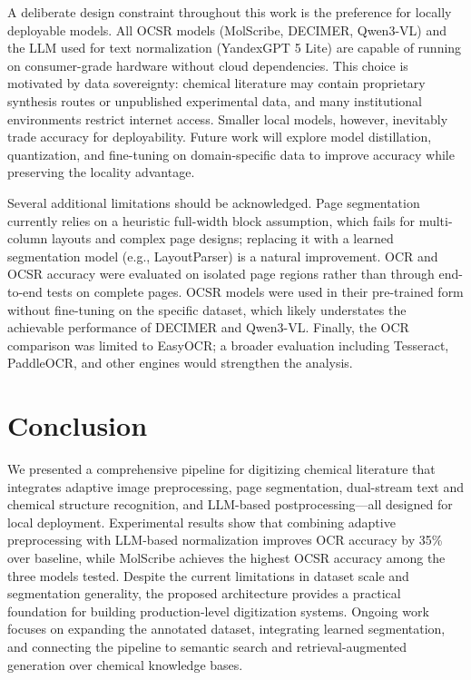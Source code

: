 \documentclass[conference]{IEEEtran}
\begin{document}
A deliberate design constraint throughout this work is the preference for locally deployable models. All OCSR models (MolScribe, DECIMER, Qwen3-VL) and the LLM used for text normalization (YandexGPT 5 Lite) are capable of running on consumer-grade hardware without cloud dependencies. This choice is motivated by data sovereignty: chemical literature may contain proprietary synthesis routes or unpublished experimental data, and many institutional environments restrict internet access. Smaller local models, however, inevitably trade accuracy for deployability. Future work will explore model distillation, quantization, and fine-tuning on domain-specific data to improve accuracy while preserving the locality advantage.

Several additional limitations should be acknowledged. Page segmentation currently relies on a heuristic full-width block assumption, which fails for multi-column layouts and complex page designs; replacing it with a learned segmentation model (e.g., LayoutParser) is a natural improvement. OCR and OCSR accuracy were evaluated on isolated page regions rather than through end-to-end tests on complete pages. OCSR models were used in their pre-trained form without fine-tuning on the specific dataset, which likely understates the achievable performance of DECIMER and Qwen3-VL. Finally, the OCR comparison was limited to EasyOCR; a broader evaluation including Tesseract, PaddleOCR, and other engines would strengthen the analysis.

\section{Conclusion}

We presented a comprehensive pipeline for digitizing chemical literature that integrates adaptive image preprocessing, page segmentation, dual-stream text and chemical structure recognition, and LLM-based postprocessing---all designed for local deployment. Experimental results show that combining adaptive preprocessing with LLM-based normalization improves OCR accuracy by 35\% over baseline, while MolScribe achieves the highest OCSR accuracy among the three models tested. Despite the current limitations in dataset scale and segmentation generality, the proposed architecture provides a practical foundation for building production-level digitization systems. Ongoing work focuses on expanding the annotated dataset, integrating learned segmentation, and connecting the pipeline to semantic search and retrieval-augmented generation over chemical knowledge bases.
\end{document}
